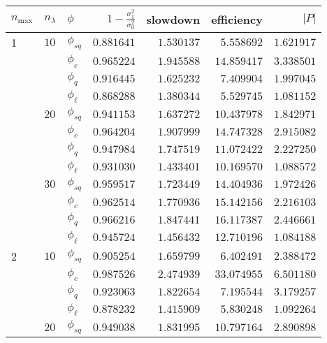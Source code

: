 \begin{table}[htb]
    \centering
\begin{tabular}{l@{\hskip 12pt}l@{\hskip 12pt}l@{\hskip 12pt}r@{\hskip 12pt}r@{\hskip 12pt}r@{\hskip 12pt}r}
\toprule
	$n_{\max}$ &   $n_{\lambda}$ & $\phi$ & $1-\frac{\sigma_1^2}{\sigma_0^2}$ &  slowdown &  efficiency &$\lvert P\rvert$ \\\midrule
	\num{1} & $10$ &$\phi_{sq}$ &  $0.881641$ &  $1.530137$ &    $5.558692$ &   $1.621917$ \\
            &    &$\phi_{c}$ &  $0.965224$ &  $1.945588$ &   $14.859417$ &   $3.338501$ \\
            &    &$\phi_{q}$ &  $0.916445$ &  $1.625232$ &    $7.409904$ &   $1.997045$ \\
            &    & $\phi_{\ell}$ &  $0.868288$ &  $1.380344$ &    $5.529745$ &   $1.081152$ \\\cmidrule{2-7}
            & $20$ &$\phi_{sq}$ &  $0.941153$ &  $1.637272$ &   $10.437978$ &   $1.842971$ \\
            &    &$\phi_{c}$ &  $0.964204$ &  $1.907999$ &   $14.747328$ &   $2.915082$ \\
            &    &$\phi_{q}$ &  $0.947984$ &  $1.747519$ &   $11.072422$ &   $2.227250$ \\
            &    & $\phi_{\ell}$ &  $0.931030$ &  $1.433401$ &   $10.169570$ &   $1.088572$ \\\cmidrule{2-7}
            & $30$ &$\phi_{sq}$ &  $0.959517$ &  $1.723449$ &   $14.404936$ &   $1.972426$ \\
            &    &$\phi_{c}$ &  $0.962514$ &  $1.770936$ &   $15.142156$ &   $2.216103$ \\
            &    &$\phi_{q}$ &  $0.966216$ &  $1.847441$ &   $16.117387$ &   $2.446661$ \\
            &    & $\phi_{\ell}$ &  $0.945724$ &  $1.456432$ &   $12.710196$ &   $1.084188$ \\\midrule
	\num{2} & $10$ &$\phi_{sq}$ &  $0.905254$ &  $1.659799$ &    $6.402491$ &   $2.388472$ \\
            &    &$\phi_{c}$ &  $0.987526$ &  $2.474939$ &   $33.074955$ &   $6.501180$ \\
            &    &$\phi_{q}$ &  $0.923063$ &  $1.822654$ &    $7.195544$ &   $3.179257$ \\
            &    & $\phi_{\ell}$ &  $0.878232$ &  $1.415909$ &    $5.830248$ &   $1.092264$ \\\cmidrule{2-7}
            & $20$ &$\phi_{sq}$ &  $0.949038$ &  $1.831995$ &   $10.797164$ &   $2.890898$ \\

\end{tabular}
\end{table}

